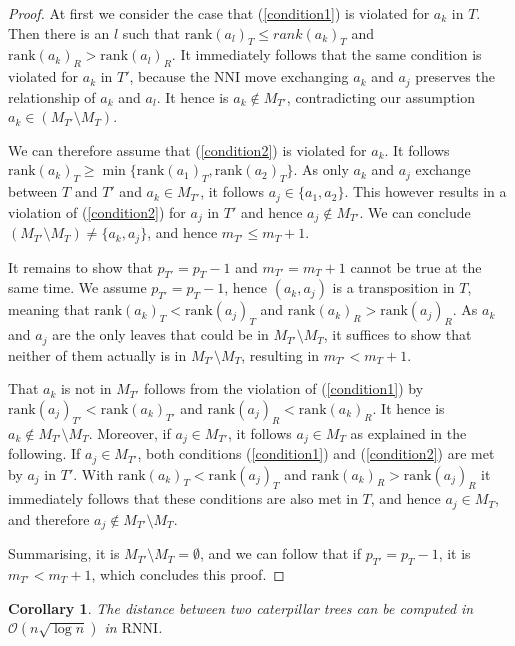\documentclass[11pt]{amsart}
\newtheorem{corollary}{Corollary}
\newcommand{\rnni}{\mathrm{RNNI}}
\newcommand{\rank}{\mathrm{rank}}
\newcommand{\nni}{\mathrm{NNI}}
\renewcommand{\O}{\mathcal O}
\begin{document}
\begin{proof}
	At first we consider the case that (\ref{condition1}) is violated for $a_k$ in $T$.
	Then there is an $l$ such that $\rank(a_l)_T \leq rank(a_k)_T$ and $\rank(a_k)_R > \rank(a_l)_R$.
	It immediately follows that the same condition is violated for $a_k$ in $T'$, because the $\nni$ move exchanging $a_k$ and $a_j$ preserves the relationship of $a_k$ and $a_l$.
	It hence is $a_k \notin M_{T'}$, contradicting our assumption $a_k \in (M_{T'} \setminus M_T)$.

	We can therefore assume that (\ref{condition2}) is violated for $a_k$.
	It follows $\rank(a_k)_T \geq \min\{\rank(a_1)_T, \rank(a_2)_T\}$.
	As only $a_k$ and $a_j$ exchange between $T$ and $T'$ and $a_k \in M_{T'}$, it follows $a_j \in \{a_1, a_2\}$.
	This however results in a violation of (\ref{condition2}) for $a_j$ in $T'$ and hence $a_j \notin M_{T'}$.
	We can conclude $(M_{T'} \setminus M_T) \neq \{a_k, a_j\}$, and hence $m_{T'} \leq m_T + 1$.

	It remains to show that $p_{T'} = p_T - 1$ and $m_{T'} = m_T + 1$ cannot be true at the same time.
	We assume $p_{T'} = p_T - 1$, hence $(a_k,a_j)$ is a transposition in $T$, meaning that $\rank(a_k)_T < \rank(a_j)_T$ and $\rank(a_k)_R > \rank(a_j)_R$.
	As $a_k$ and $a_j$ are the only leaves that could be in $M_{T'} \setminus M_T$, it suffices to show that neither of them actually is in $M_{T'} \setminus M_T$, resulting in $m_{T'} < m_T + 1$.

	That $a_k$ is not in $M_{T'}$ follows from the violation of (\ref{condition1}) by $\rank(a_j)_{T'} < \rank(a_k)_{T'}$ and $\rank(a_j)_R < \rank(a_k)_R$.
	It hence is $a_k \notin M_{T'} \setminus M_T$.
	Moreover, if $a_j \in M_{T'}$, it follows $a_j \in M_T$ as explained in the following.
	If $a_j \in M_{T'}$, both conditions (\ref{condition1}) and (\ref{condition2}) are met by $a_j$ in $T'$.
	With $\rank(a_k)_T < \rank(a_j)_T$ and $\rank(a_k)_R > \rank(a_j)_R$ it immediately follows that these conditions are also met in $T$, and hence $a_j \in M_T$, and therefore $a_j \notin M_{T'} \setminus M_T$.

	Summarising, it is $M_{T'} \setminus M_T = \emptyset$, and we can follow that if $p_{T'} = p_T - 1$, it is $m_{T'} < m_T + 1$, which concludes this proof.
\end{proof}

\begin{corollary}
	The distance between two caterpillar trees can be computed in $\O(n \sqrt{\log n})$ in $\rnni$.
	\label{cor:caterpillar_distance_rnni_nlogn}
\end{corollary}
\end{document}
